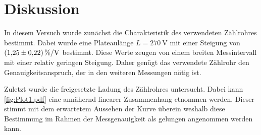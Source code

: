 \section{Diskussion}
\label{sec:Diskussion}
In diesem Versuch wurde zunächst die Charakteristik des verwendeten Zählrohres bestimmt. Dabei wurde eine Plateaulänge $L = \qty{270}{\volt}$ mit einer Steigung von 
$\qty{1.25+-0.22}{\percent\per\volt}$ bestimmt. Diese Werte zeugen von einem breiten Messintervall mit einer relativ geringen Steigung. Daher genügt das verwendete 
Zählrohr den Genauigkeitsanspruch, der in den weiteren Messungen nötig ist.


Zuletzt wurde die freigesetzte Ladung des Zählrohres untersucht. Dabei kann \autoref{fig:Plot1.pdf} eine annähernd linearer Zusammenhang etnommen werden. Dieser stimmt mit 
dem erwartetem Aussehen der Kurve überein weshalb diese Bestimmung im Rahmen der Messgenauigkeit als gelungen angenommen werden kann.